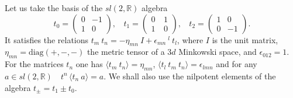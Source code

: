 \documentclass[a4paper,12pt]{article}
\newcommand{\rr}{\mathbb{R}}
\begin{document}
\noindent
Let us take the basis of the $sl(2,\rr)$ algebra
\begin{equation}\label{T}
  t_0=\left( \begin{array}{cr}
  0&-1\\1&0 \end{array}\right),~~~~
   t_1=\left( \begin{array}{cr}
  0&~1\\1&~0 \end{array}\right),~~~~
 t_2=\left( \begin{array}{cr}
  1&0\\0&-1 \end{array}\right).
\end{equation}
It satisfies the relations
$t_m~t_n=-\eta_{mn}~I+\epsilon_{mn}~^l~t_l$, where $I$ is the unit
matrix, $\eta_{mn}=\mbox{diag}(+,-,-)$ the metric tensor of a $3d$
Minkowski space, and $\epsilon_{012}=1$. For the matrices $t_n$ one has
$\langle t_m~t_n \rangle =\eta_{mn}$, $\langle t_l~ t_m~t_n \rangle =
\epsilon_{lmn}$
 and for any $a\in sl(2,\rr)$ \,\,
$t^n\,\langle t_n~a \rangle =a$. We shall also use the nilpotent
elements of the algebra $t_\pm =t_1\pm t_0$.
\end{document}
